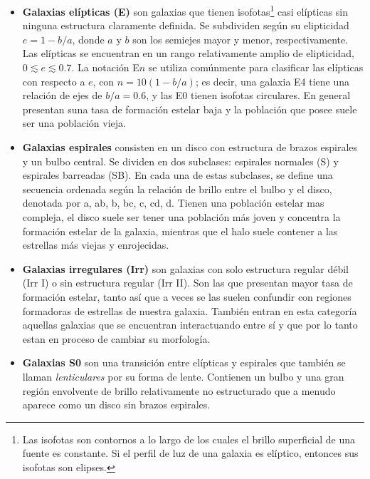 \documentclass[twocolumn]{article}
\begin{document}
\begin{itemize}
    \item \textbf{Galaxias elípticas (E)} son galaxias que tienen isofotas\footnote{Las isofotas son contornos a lo largo de los cuales el brillo superficial de una fuente es constante. Si el perfil de luz de una galaxia es elíptico, entonces sus isofotas son elipses.} casi elípticas sin ninguna estructura claramente definida. Se subdividen según su elipticidad $e = 1 - b/a$, donde $a$ y $b$ son los semiejes mayor y menor, respectivamente. Las elípticas se encuentran en un rango relativamente amplio de elipticidad, $0 \lesssim e\lesssim 0.7$. La notación E$n$ se utiliza comúnmente para clasificar las elípticas con respecto a $e$, con $n = 10(1 - b/a)$; es decir, una galaxia E4 tiene una relación de ejes de $b/a = 0.6$, y las E0 tienen isofotas circulares. En general presentan suna tasa de formación estelar baja y la población que posee suele ser una población vieja.

    \item \textbf{Galaxias espirales} consisten en un disco con estructura de brazos espirales y un bulbo central. Se dividen en dos subclases: espirales normales (S) y espirales barreadas (SB). En cada una de estas subclases, se define una secuencia ordenada según la relación de brillo entre el bulbo y el disco, denotada por a, ab, b, bc, c, cd, d. Tienen una población estelar mas compleja, el disco suele ser tener una población más joven y concentra la formación estelar de la galaxia, mientras que el halo suele contener a las estrellas más viejas y enrojecidas.

    \item \textbf{Galaxias irregulares (Irr)} son galaxias con solo estructura regular débil (Irr I) o sin estructura regular (Irr II). Son las que presentan mayor tasa de formación estelar, tanto así que a veces se las suelen confundir con regiones formadoras de estrellas de nuestra galaxia. También entran en esta categoría aquellas galaxias que se encuentran interactuando entre sí y que por lo tanto estan en proceso de cambiar su morfología.

    \item \textbf{Galaxias S0} son una transición entre elípticas y espirales que también se llaman \textit{lenticulares} por su forma de lente. Contienen un bulbo y una gran región envolvente de brillo relativamente no estructurado que a menudo aparece como un disco sin brazos espirales.
\end{itemize}
\end{document}
